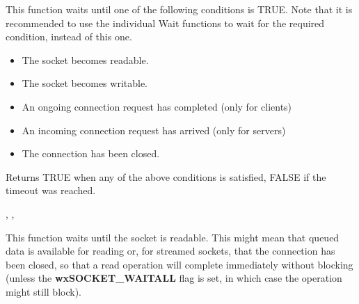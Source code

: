 %
%
\label{wxsocketbasewait}


This function waits until one of the following conditions is TRUE. Note
that it is recommended to use the individual Wait functions to wait for
the required condition, instead of this one.
                                            
\begin{itemize}
\item The socket becomes readable.
\item The socket becomes writable.
\item An ongoing connection request has completed (only for clients)
\item An incoming connection request has arrived (only for servers)
\item The connection has been closed.
\end{itemize}





Returns TRUE when any of the above conditions is satisfied,
FALSE if the timeout was reached.


, 
, 

%
%
\label{wxsocketbasewaitforread}


This function waits until the socket is readable. This might mean that
queued data is available for reading or, for streamed sockets, that
the connection has been closed, so that a read operation will complete
immediately without blocking (unless the {\bf wxSOCKET\_WAITALL} flag
is set, in which case the operation might still block).


